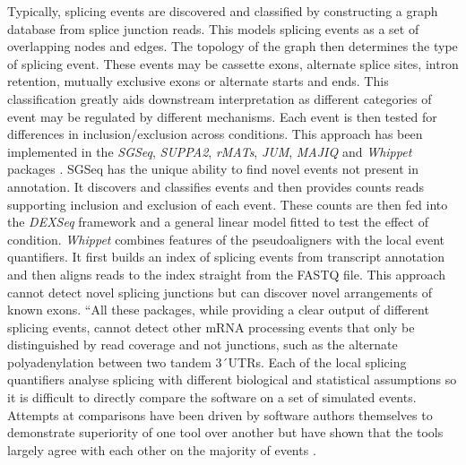 Typically, splicing events are discovered and classified by constructing a graph database from splice junction reads.
This models splicing events as a set of overlapping nodes and edges. 
The topology of the graph then determines the type of splicing event.
These events may be cassette exons, alternate splice sites, intron retention, mutually exclusive exons or alternate starts and ends. 
This classification greatly aids downstream interpretation as different categories of event may be regulated by different mechanisms.
 Each event is then tested for differences in inclusion/exclusion across conditions. 
 This approach has been implemented in the \textit{SGSeq}, \textit{SUPPA2}, \textit{rMATs}, \textit{JUM}, \textit{MAJIQ} and \textit{Whippet} packages \citep{Goldstein2016,Trincado2018,Vaquero-Garcia2016,Wang2018a,Shen2014, Sterne-Weiler2018a}. 
SGSeq has the unique ability to find novel events not present in annotation. 
It discovers and classifies events and then provides counts reads supporting inclusion and exclusion of each event.
These counts are then fed into the \textit{DEXSeq} framework and a general linear model fitted to test the effect of condition. %
\textit{Whippet} combines features of the pseudoaligners with the local event quantifiers. 
It first builds an index of splicing events from transcript annotation and then aligns reads to the index straight from the FASTQ file. 
This approach cannot detect novel splicing junctions but can discover novel arrangements of known exons.
“All these packages, while providing a clear output of different splicing events, cannot detect other mRNA processing events that only be distinguished by read coverage and not junctions, such as the alternate polyadenylation between two tandem 3\'\ UTRs.  
Each of the local splicing quantifiers analyse splicing with different biological and statistical assumptions so it is difficult to directly compare the software on a set of simulated events. 
Attempts at comparisons have been driven by software authors themselves to demonstrate superiority of one tool over another but have shown that the tools largely agree with each other on the majority of events \citep{Trincado2018, Vaquero-Garcia2018}. 

